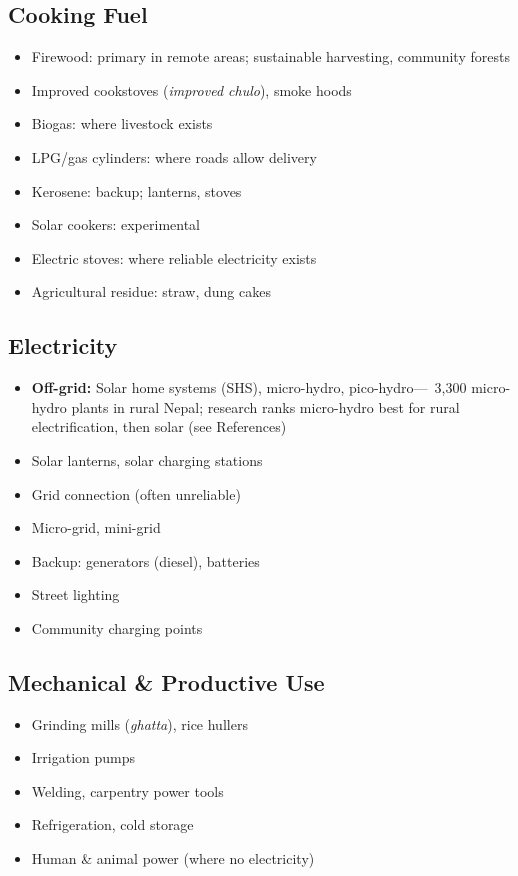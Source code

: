 \documentclass[11pt,a4paper]{article}
\begin{document}
\subsection{Cooking Fuel}
\begin{itemize}
    \item Firewood: primary in remote areas; sustainable harvesting, community forests
    \item Improved cookstoves (\textit{improved chulo}), smoke hoods
    \item Biogas: where livestock exists
    \item LPG/gas cylinders: where roads allow delivery
    \item Kerosene: backup; lanterns, stoves
    \item Solar cookers: experimental
    \item Electric stoves: where reliable electricity exists
    \item Agricultural residue: straw, dung cakes
\end{itemize}

\subsection{Electricity}
\begin{itemize}
    \item \textbf{Off-grid:} Solar home systems (SHS), micro-hydro, pico-hydro---~3,300 micro-hydro plants in rural Nepal; research ranks micro-hydro best for rural electrification, then solar (see References)
    \item Solar lanterns, solar charging stations
    \item Grid connection (often unreliable)
    \item Micro-grid, mini-grid
    \item Backup: generators (diesel), batteries
    \item Street lighting
    \item Community charging points
\end{itemize}

\subsection{Mechanical \& Productive Use}
\begin{itemize}
    \item Grinding mills (\textit{ghatta}), rice hullers
    \item Irrigation pumps
    \item Welding, carpentry power tools
    \item Refrigeration, cold storage
    \item Human \& animal power (where no electricity)
\end{itemize}
\end{document}
